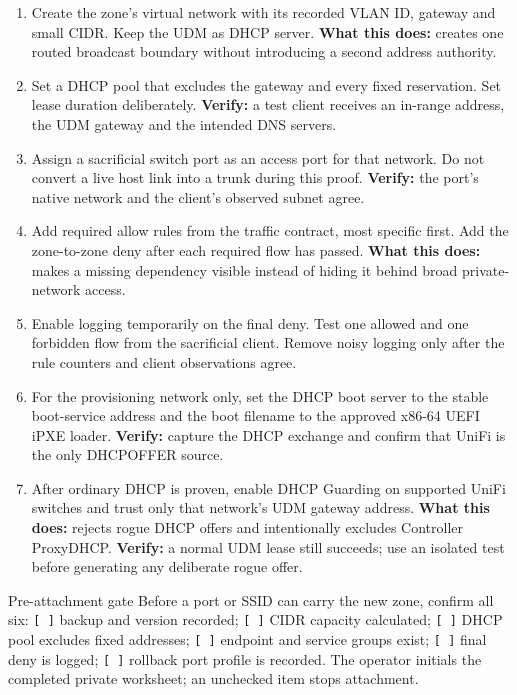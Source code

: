 \begin{enumerate}
\item Create the zone's virtual network with its recorded VLAN ID, gateway and
small CIDR.  Keep the UDM as DHCP server.  \textbf{What this does:} creates one
routed broadcast boundary without introducing a second address authority.
\item Set a DHCP pool that excludes the gateway and every fixed reservation.
Set lease duration deliberately.  \textbf{Verify:} a test client receives an
in-range address, the UDM gateway and the intended DNS servers.
\item Assign a sacrificial switch port as an access port for that network.
Do not convert a live host link into a trunk during this proof.
\textbf{Verify:} the port's native network and the client's observed subnet agree.
\item Add required allow rules from the traffic contract, most specific first.
Add the zone-to-zone deny after each required flow has passed.
\textbf{What this does:} makes a missing dependency visible instead of hiding
it behind broad private-network access.
\item Enable logging temporarily on the final deny.  Test one allowed and one
forbidden flow from the sacrificial client.  Remove noisy logging only after
the rule counters and client observations agree.
\item For the provisioning network only, set the DHCP boot server to the stable
boot-service address and the boot filename to the approved x86-64 UEFI iPXE
loader.  \textbf{Verify:} capture the DHCP exchange and confirm that UniFi is
the only DHCPOFFER source.
\item After ordinary DHCP is proven, enable DHCP Guarding on supported UniFi
switches and trust only that network's UDM gateway address.
\textbf{What this does:} rejects rogue DHCP offers and intentionally excludes
Controller ProxyDHCP.  \textbf{Verify:} a normal UDM lease still succeeds; use
an isolated test before generating any deliberate rogue offer.
\end{enumerate}

\begin{telospanel}{Pre-attachment gate}
Before a port or SSID can carry the new zone, confirm all six:
\texttt{[ ]} backup and version recorded;\quad
\texttt{[ ]} CIDR capacity calculated;\quad
\texttt{[ ]} DHCP pool excludes fixed addresses;\quad
\texttt{[ ]} endpoint and service groups exist;\quad
\texttt{[ ]} final deny is logged;\quad
\texttt{[ ]} rollback port profile is recorded.
The operator initials the completed private worksheet; an unchecked item stops
attachment.
\end{telospanel}

